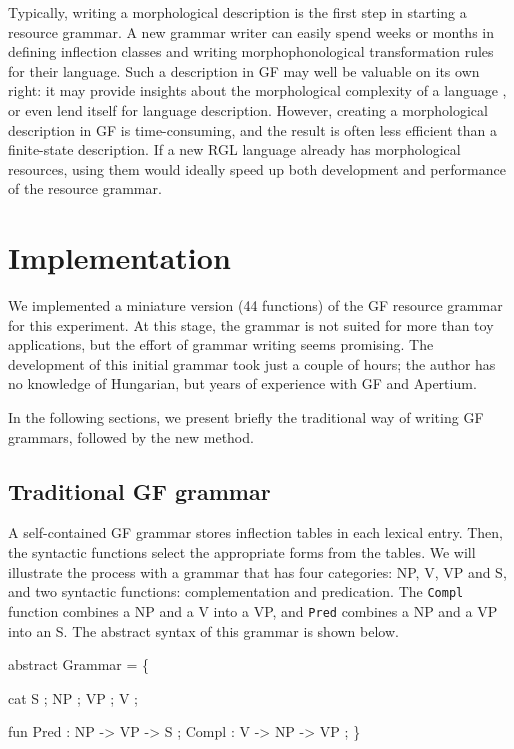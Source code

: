 \documentclass[10pt,a4paper]{article}
\newenvironment{Shaded}{\begin{snugshade}}{\end{snugshade}}
\newcommand{\DataTypeTok}[1]{\textcolor[rgb]{0.13,0.29,0.53}{{#1}}}
\newcommand{\OtherTok}[1]{\textcolor[rgb]{0.56,0.35,0.01}{{#1}}}
\newcommand{\FunctionTok}[1]{\textcolor[rgb]{0.00,0.00,0.00}{{#1}}}
\newcommand{\NormalTok}[1]{{#1}}
\begin{document}
Typically, writing a morphological description is the first step in starting a resource grammar.
A new grammar writer can easily spend weeks or months in defining inflection classes 
and writing morphophonological transformation rules for their language. 
Such a description in GF may well be valuable on its own right: it may provide 
insights about the morphological complexity of a language
\cite{detrez_ranta2012eacl}, or even lend itself for language description.
However, creating a morphological description in GF is time-consuming, and the result 
is often less efficient than a finite-state description.
If a new RGL language already has morphological resources, using them would ideally
speed up both development and performance of the resource grammar.


\section{Implementation}

We implemented a miniature version (44 functions) of the GF resource
grammar \cite{ranta2009lilt} for this experiment. 
At this stage, the grammar is not suited for more than toy
applications, but the effort of grammar writing seems promising.
The development of this initial grammar took just a
couple of hours; the author has no knowledge of Hungarian, but years
of experience with GF and Apertium.

In the following sections, we present briefly the traditional way of writing GF
grammars, followed by the new method.

\subsection{Traditional GF grammar}

A self-contained GF grammar stores inflection tables in each lexical
entry. Then, the syntactic functions select the appropriate forms from
the tables. We will illustrate the process with a grammar that has
four categories: NP, V, VP and S, and two syntactic functions: complementation
and predication. The \texttt{Compl} function combines a NP and a V
into a VP, and \texttt{Pred} combines a NP and a VP into an S.
The abstract syntax of this grammar is shown below.
 


\begin{Shaded}
\begin{Highlighting}[]
  \NormalTok{abstract }\DataTypeTok{Grammar} \FunctionTok{=} \NormalTok{\{}

  \NormalTok{cat }
    \DataTypeTok{S} \NormalTok{; }\DataTypeTok{NP} \NormalTok{; }\DataTypeTok{VP} \NormalTok{; }\DataTypeTok{V} \NormalTok{;}

  \NormalTok{fun}
    \DataTypeTok{Pred} \FunctionTok{:} \DataTypeTok{NP} \OtherTok{->} \DataTypeTok{VP} \OtherTok{->} \DataTypeTok{S} \NormalTok{;}
    \DataTypeTok{Compl} \FunctionTok{:} \DataTypeTok{V} \OtherTok{->} \DataTypeTok{NP} \OtherTok{->} \DataTypeTok{VP} \NormalTok{;}
  \NormalTok{\}}
\end{Highlighting}
\end{Shaded}
\end{document}
